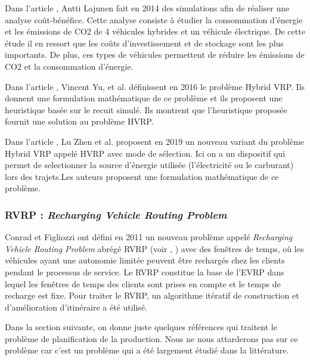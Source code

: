 Dans l'article \cite{article_HVRP2}, Antti Lajunen fait en 2014 des simulations afin de réaliser une analyse coût-bénéfice. Cette analyse consiste à étudier la consommation d'énergie et les émissions de CO2 de 4 véhicules hybrides et un véhicule électrique. De cette étude il en ressort que les coûts d'investissement et de stockage sont les plus importants. De plus, ces types de véhicules permettent de réduire les émissions de CO2 et la consommation d'énergie.
 
Dans l'article \cite{article_HVRP5}, Vincent Yu, et al. définissent en 2016 le problème Hybrid VRP. Ils donnent une formulation mathématique de ce problème et ils proposent une heuristique basée sur le recuit simulé. Ils montrent que l'heuristique proposée fournit une solution au problème HVRP. 

Dans l'article \cite{article_HVRP3}, Lu Zhen et al. proposent en 2019 un nouveau variant du problème Hybrid VRP appelé HVRP avec mode de sélection. Ici on a un dispositif qui permet de selectionner la source d'énergie utilisée (l'électricité ou le carburant) lors des trajets.Les auteurs proposent une formulation mathématique de ce problème.



\subsubsection{RVRP : \textit{Recharging Vehicle Routing Problem}}

Conrad et Figliozzi ont défini en 2011 un nouveau problème  appelé \textit{Recharging Vehicle Routing Problem} abrégé RVRP (voir \cite{ANGEL20141}, \cite{Energy-Efficient-Albers-Susanne}) avec des fenêtres de temps, où les véhicules ayant une autonomie limitée peuvent être rechargés chez les clients pendant le processus de service. Le RVRP constitue la base de l'EVRP dans lequel les fenêtres de temps des clients sont prises en compte et le temps de recharge est fixe. Pour traiter le RVRP, un algorithme itératif de construction et d'amélioration d'itinéraire a été utilisé.



Dans la section suivante, on donne juste quelques références qui traitent le problème de planification de la production. Nous ne nous attarderons pas sur ce problème car c'est un problème qui a été largement étudié dans la littérature. 
